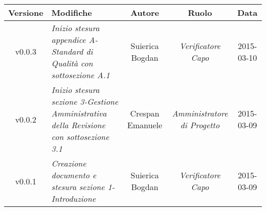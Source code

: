 \newpage

\begin{table}[h]
\centering
\begin{tabular}{|c|p{}|c|c|c|}
	\toprule
		\textbf{Versione} & \textbf{Modifiche} & \textbf{Autore} & \textbf{Ruolo} & \textbf{Data} \\
	\midrule
	\midrule
		v0.0.3 & \textit{Inizio stesura appendice A-Standard di Qualità con sottosezione A.1} & Suierica Bogdan & \textit{Verificatore Capo} & 2015-03-10\\
	\midrule
		v0.0.2 & \textit{Inizio stesura sezione 3-Gestione Amministrativa della Revisione con sottosezione 3.1} & Crespan Emanuele & \textit{Amministratore di Progetto} & 2015-03-09\\
	\midrule
		v0.0.1 & \textit{Creazione documento e stesura sezione 1-Introduzione} & Suierica Bogdan & \textit{Verificatore Capo} & 2015-03-09\\
	\bottomrule
\end{tabular}
\end{table}

\newpage
